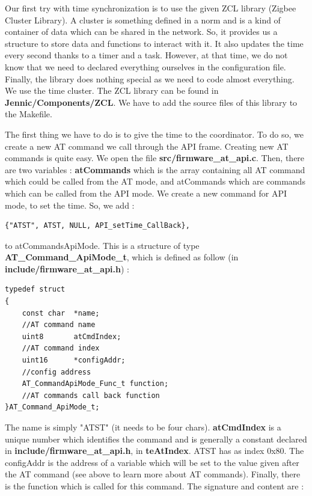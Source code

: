 Our first try with time synchronization is to use the given ZCL library (Zigbee Cluster Library). A cluster is something defined in a norm and is a kind of container of data which can be shared in the network. So, it provides us a structure to store data and functions to interact with it. It also updates the time every second thanks to a timer and a task. However, at that time, we do not know that we need to declared everything ourselves in the configuration file. Finally, the library does nothing special as we need to code almost everything. We use the time cluster. The ZCL library can be found in \textbf{Jennic/Components/ZCL}. We have to add the source files of this library to the Makefile.

The first thing we have to do is to give the time to the coordinator. To do so, we create a new AT command we call through the API frame. Creating new AT commands is quite easy. We open the file \textbf{src/firmware\_at\_api.c}. Then, there are two variables : \textbf{atCommands} which is the array containing all AT command which could be called from the AT mode, and atCommands which are commands which can be called from the API mode. We create a new command for API mode, to set the time. So, we add :

\begin{lstlisting}[frame=single]
{"ATST", ATST, NULL, API_setTime_CallBack},
\end{lstlisting}

to atCommandsApiMode. This is a structure of type \textbf{AT\_Command\_ApiMode\_t}, which is defined as follow (in \textbf{include/firmware\_at\_api.h}) :

\begin{lstlisting}[frame=single]
typedef struct
{
    const char  *name;                  
    //AT command name
    uint8       atCmdIndex;             
    //AT command index
    uint16      *configAddr;            
    //config address
    AT_CommandApiMode_Func_t function;  
    //AT commands call back function
}AT_Command_ApiMode_t;
\end{lstlisting}

The name is simply "ATST" (it needs to be four chars). \textbf{atCmdIndex} is a unique number which identifies the command and is generally a constant declared in \textbf{include/firmware\_at\_api.h}, in \textbf{teAtIndex}. ATST has as index 0x80. The configAddr is the address of a variable which will be set to the value given after the AT command (see above to learn more about AT commands). Finally, there is the function which is called for this command. The signature and content are :

